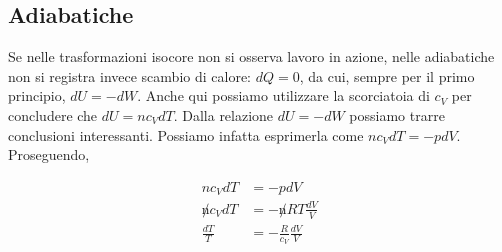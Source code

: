 \subsection{Adiabatiche}
Se nelle trasformazioni isocore non si osserva lavoro in azione, nelle
adiabatiche non si registra invece scambio di calore: $dQ = 0$, da cui,
sempre per il primo principio, $dU = -dW$. Anche qui possiamo utilizzare
la scorciatoia di $c_V$ per concludere che $dU = nc_VdT$.
Dalla relazione $dU = -dW$ possiamo trarre conclusioni interessanti.
Possiamo infatta esprimerla come $nc_VdT = -pdV$. Proseguendo,

\begin{align*}
    nc_VdT &= -pdV\\
    \not n c_VdT &= -\not n RT\frac{dV}{V}\\
    \frac{dT}{T} &= -\frac{R}{c_V}\frac{dV}{V}
\end{align*}

